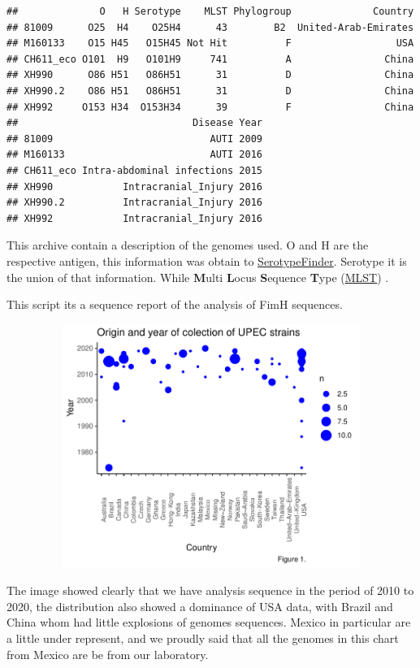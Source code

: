 \documentclass[
]{article}
\begin{document}
\begin{verbatim}
##              O   H Serotype    MLST Phylogroup              Country
## 81009      O25  H4    O25H4      43        B2  United-Arab-Emirates
## M160133    O15 H45   O15H45 Not Hit          F                  USA
## CH611_eco O101  H9   O101H9     741          A                China
## XH990      O86 H51   O86H51      31          D                China
## XH990.2    O86 H51   O86H51      31          D                China
## XH992     O153 H34  O153H34      39          F                China
##                              Disease Year
## 81009                           AUTI 2009
## M160133                         AUTI 2016
## CH611_eco Intra-abdominal infections 2015
## XH990            Intracranial_Injury 2016
## XH990.2          Intracranial_Injury 2016
## XH992            Intracranial_Injury 2016
\end{verbatim}

This archive contain a description of the genomes used. O and H are the
respective antigen, this information was obtain to
\href{https://cge.cbs.dtu.dk/services/SerotypeFinder/}{SerotypeFinder}.
Serotype it is the union of that information. While \textbf{M}ulti
\textbf{L}ocus \textbf{S}equence \textbf{T}ype
(\href{https://pubmlst.org/organisms/escherichia-spp}{MLST}) .

This script its a sequence report of the analysis of FimH sequences.

\includegraphics[width=23.35417in,height=3.125in]{images/Fig1-01.pdf}

The image showed clearly that we have analysis sequence in the period of
2010 to 2020, the distribution also showed a dominance of USA data, with
Brazil and China whom had little explosions of genomes sequences. Mexico
in particular are a little under represent, and we proudly said that all
the genomes in this chart from Mexico are be from our laboratory.
\end{document}
